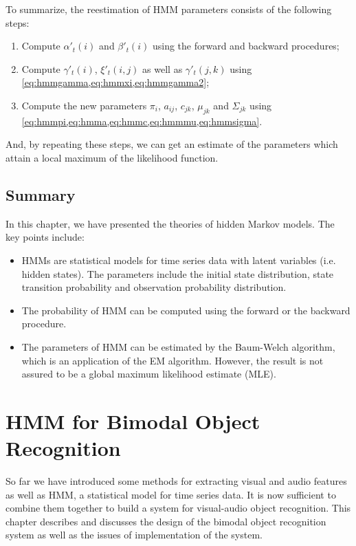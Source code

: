 \documentclass[12pt,final,twoside]{report}
\begin{document}
To summarize, the reestimation of HMM parameters consists of the following steps:
\begin{enumerate}
  \item Compute $\alpha'_t(i)$ and $\beta'_t(i)$ using the forward and backward procedures;
  \item Compute $\gamma'_t(i)$, $\xi'_t(i,j)$ as well as $\gamma'_t(j,k)$ using \cref{eq:hmmgamma,eq:hmmxi,eq:hmmgamma2};
  \item Compute the new parameters $\pi_i$, $a_{ij}$, $c_{jk}$, $\mu_{jk}$ and $\Sigma_{jk}$ using \cref{eq:hmmpi,eq:hmma,eq:hmmc,eq:hmmmu,eq:hmmsigma}.
\end{enumerate}
And, by repeating these steps, we can get an estimate of the parameters which attain a local maximum of the likelihood function.

\section{Summary}
In this chapter, we have presented the theories of hidden Markov models. The key points include:
\begin{itemize}
  \item HMMs are statistical models for time series data with latent variables (i.e. hidden states). The parameters include the initial state distribution, state transition probability and observation probability distribution.
  \item The probability of HMM can be computed using the forward or the backward procedure.
  \item The parameters of HMM can be estimated by the Baum-Welch algorithm, which is an application of the EM algorithm. However, the result is not assured to be a global maximum likelihood estimate (MLE).
\end{itemize}

\cleardoublepage
\chapter{HMM for Bimodal Object Recognition}
\label{ch:bimodal}
So far we have introduced some methods for extracting visual and audio features as well as HMM, a statistical model for time series data. It is now sufficient to combine them together to build a system for visual-audio object recognition. This chapter describes and discusses the design of the bimodal object recognition system as well as the issues of implementation of the system. 
\end{document}
